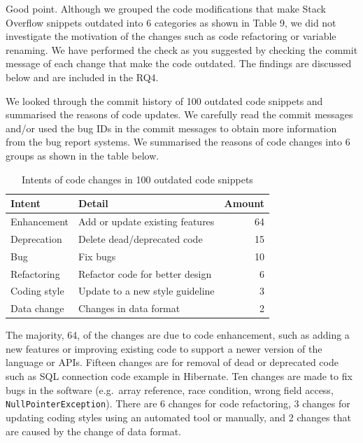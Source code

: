\documentclass[a4paper,twoside,10pt]{reviewresponse}
\begin{document}
		

Good point. Although we grouped the code modifications that make Stack Overflow snippets outdated into 6 categories as shown in Table 9, we did not investigate the motivation of the changes such as code refactoring or variable renaming. We have performed the check as you suggested by checking the commit message of each change that make the code outdated. The findings are discussed below and are included in the RQ4.

We looked through the commit history of 100 outdated code snippets and summarised the reasons of code updates. We carefully read the commit messages and/or used the bug IDs in the commit messages to obtain more information from the bug report systems. We summarised the reasons of code changes into 6 groups as shown in the table below.

\begin{table}[H]
	\centering
	\begin{tabular}{llr}
		\toprule
		Intent & Detail & Amount \\
		\midrule
		Enhancement & Add or update existing features & 64 \\
		Deprecation & Delete dead/deprecated code & 15 \\
		Bug & Fix bugs & 10 \\
		Refactoring & Refactor code for better design & 6 \\
		Coding style & Update to a new style guideline & 3 \\
		Data change & Changes in data format & 2 \\
		\bottomrule
	\end{tabular}
	\label{tab:intent_outdated}
	\caption{Intents of code changes in 100 outdated code snippets}
\end{table}

The majority, 64, of the changes are due to code enhancement, such as adding a new features or improving existing code to support a newer version of the language or APIs. Fifteen changes are for removal of dead or deprecated code such as SQL connection code example in Hibernate. Ten changes are made to fix bugs in the software (e.g.~array reference, race condition, wrong field access, \texttt{NullPointerException}). There are 6 changes for code refactoring, 3 changes for updating coding styles using an automated tool or manually, and 2 changes that are caused by the change of data format.
\end{document}

